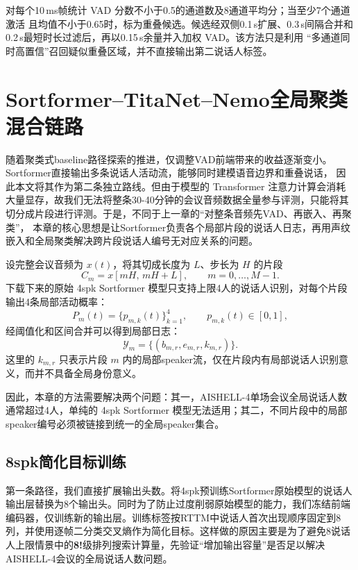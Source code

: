 \documentclass[UTF8,a4paper,10pt]{ctexart}
\begin{document}
对每个10\,ms帧统计 VAD 分数不小于0.5的通道数及8通道平均分；当至少7个通道激活
且均值不小于0.65时，标为重叠候选。候选经双侧0.1\,s扩展、0.3\,s间隔合并和
0.2\,s最短时长过滤后，再以0.15\,s余量并入加权 VAD。该方法只是利用
“多通道同时高置信”召回疑似重叠区域，并不直接输出第二说话人标签。

\section{Sortformer--TitaNet--Nemo全局聚类混合链路}

随着聚类式baseline路径探索的推进，仅调整VAD前端带来的收益逐渐变小。
Sortformer直接输出多条说话人活动流，能够同时建模语音边界和重叠说话，
因此本文将其作为第二条独立路线。但由于模型的 Transformer 注意力计算会消耗大量显存，故我们无法将整条30-40分钟的会议音频数据全量参与评测，只能将其切分成片段进行评测。于是，不同于上一章的“对整条音频先VAD、再嵌入、再聚类”，
本章的核心思想是让Sortformer负责各个局部片段的说话人日志，再用声纹嵌入和全局聚类解决跨片段说话人编号无对应关系的问题。

设完整会议音频为 $x(t)$，将其切成长度为 $L$、步长为 $H$ 的片段
\begin{equation}
C_m = x[mH,\,mH+L],\qquad m=0,\ldots,M-1 .
\end{equation}
下载下来的原始 4spk Sortformer 模型只支持上限4人的说话人识别，对每个片段输出4条局部活动概率：
\begin{equation}
P_m(t)=\{p_{m,k}(t)\}_{k=1}^{4},\qquad p_{m,k}(t)\in[0,1],
\end{equation}
经阈值化和区间合并可以得到局部日志：
\begin{equation}
\mathcal{Y}_m=\{(b_{m,r},e_{m,r},k_{m,r})\}.
\end{equation}
这里的 $k_{m,r}$ 只表示片段 $m$ 内的局部speaker流，仅在片段内有局部说话人识别意义，而并不具备全局身份意义。


因此，本章的方法需要解决两个问题：其一，AISHELL-4单场会议全局说话人数通常超过4人，单纯的 4spk Sortformer 模型无法适用；其二，不同片段中的局部speaker编号必须被链接到统一的全局speaker集合。




\subsection{8spk简化目标训练}

第一条路径，我们直接扩展输出头数。将4spk预训练Sortformer原始模型的说话人输出层替换为8个输出头。同时为了防止过度削弱原始模型的能力，我们冻结前端编码器，仅训练新的输出层。训练标签按RTTM中说话人首次出现顺序固定到8列，并使用逐帧二分类交叉熵作为简化目标。这样做的原因主要是为了避免8说话人上限情景中的\textbf{8!}级排列搜索计算量，先验证“增加输出容量”是否足以解决AISHELL-4会议的全局说话人数问题。
\end{document}
